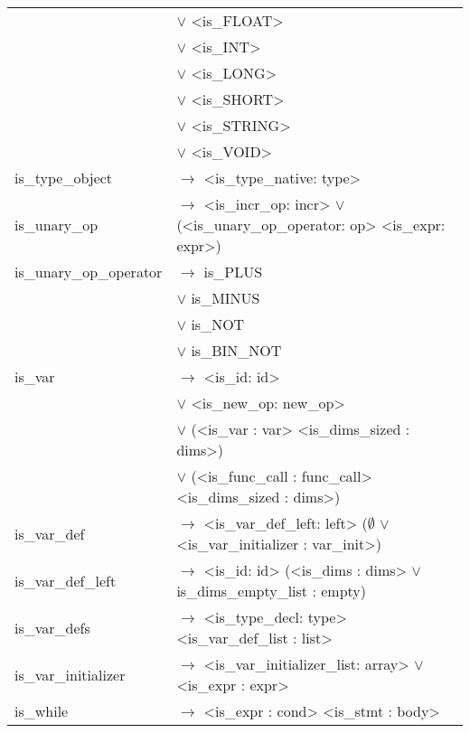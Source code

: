 \documentclass[a4paper]{article}
\begin{document}
\begin{tabular}{ll}
											& $\vee$ <is\_FLOAT> \\
											& $\vee$ <is\_INT> \\
											& $\vee$ <is\_LONG> \\
											& $\vee$ <is\_SHORT> \\
											& $\vee$ <is\_STRING> \\
											& $\vee$ <is\_VOID> \\
	is\_type\_object		 				& $\to$ <is\_type\_native: type> \\
	is\_unary\_op			 				& $\to$ <is\_incr\_op: incr> $\vee$ (<is\_unary\_op\_operator: op> <is\_expr: expr>) \\
	is\_unary\_op\_operator					& $\to$ is\_PLUS \\
											& $\vee$ is\_MINUS \\
											& $\vee$ is\_NOT \\
											& $\vee$ is\_BIN\_NOT \\
	is\_var					 				& $\to$ <is\_id: id> \\
											& $\vee$ <is\_new\_op: new\_op> \\
											& $\vee$ (<is\_var : var> <is\_dims\_sized : dims>) \\
											& $\vee$ (<is\_func\_call : func\_call> <is\_dims\_sized : dims>) \\
	is\_var\_def			 				& $\to$ <is\_var\_def\_left: left> ($\emptyset$ $\vee$ <is\_var\_initializer : var\_init>) \\
	is\_var\_def\_left		 				& $\to$ <is\_id: id> (<is\_dims : dims> $\vee$ is\_dims\_empty\_list : empty) \\
	is\_var\_defs		 					& $\to$ <is\_type\_decl: type> <is\_var\_def\_list : list> \\
	is\_var\_initializer 					& $\to$ <is\_var\_initializer\_list: array> $\vee$ <is\_expr : expr> \\
	is\_while 								& $\to$ <is\_expr : cond> <is\_stmt : body> \\
\end{tabular}
\end{document}
